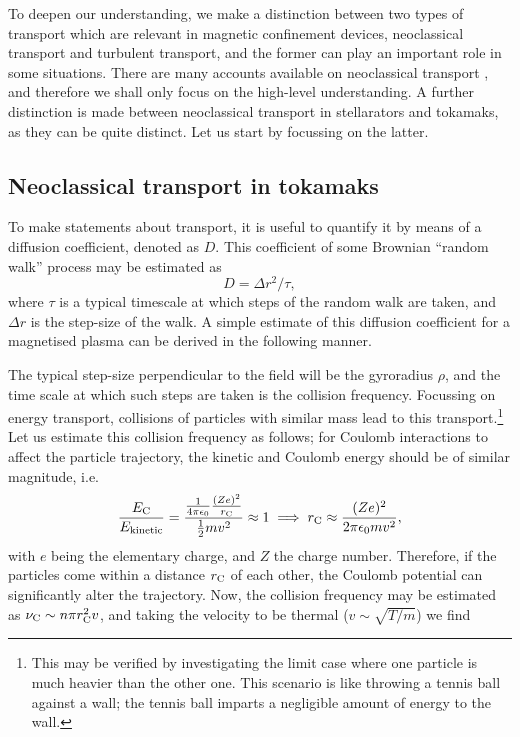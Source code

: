 To deepen our understanding, we make a distinction between two types of transport which are relevant in magnetic confinement devices, neoclassical transport and turbulent transport, and the former can play an important role in some situations. There are many accounts available on neoclassical transport \cite{galeev1979reviews,kovrizhnykh1984energy,mynick2006transport,freidberg2008plasma,beidler2011benchmarking,wesson2011tokamaks}, and therefore we shall only focus on the high-level understanding. A further distinction is made between neoclassical transport in stellarators and tokamaks, as they can be quite distinct. Let us start by focussing on the latter.

\subsection{Neoclassical transport in tokamaks}
To make statements about transport, it is useful to quantify it by means of a diffusion coefficient, denoted as $D$. This coefficient of some Brownian ``random walk'' process may be estimated as
\begin{equation*}
    D = \Delta r^2/\tau,
\end{equation*}
where $\tau$ is a typical timescale at which steps of the random walk are taken, and $\Delta r$ is the step-size of the walk. A simple estimate of this diffusion coefficient for a magnetised plasma can be derived in the following manner. \par 
The typical step-size perpendicular to the field will be the gyroradius $\rho$, and the time scale at which such steps are taken is the collision frequency. Focussing on energy transport, collisions of particles with similar mass lead to this transport.\footnote{This may be verified by investigating the limit case where one particle is much heavier than the other one. This scenario is like throwing a tennis ball against a wall; the tennis ball imparts a negligible amount of energy to the wall.} Let us estimate this collision frequency as follows; for Coulomb interactions to affect the particle trajectory, the kinetic and Coulomb energy should be of similar magnitude, i.e.
\begin{equation*}
    \frac{E_{\rm C}}{E_{\rm kinetic}} = \frac{\frac{1}{4\pi \epsilon_0} \frac{(Ze)^2}{r_{\rm C}} }{\frac{1}{2} m v^2} \approx 1 \implies r_{\rm C} \approx \frac{(Ze)^2}{2 \pi \epsilon_0 m v^2},
\end{equation*}
with $e$ being the elementary charge, and $Z$ the charge number. Therefore, if the particles come within a distance $r_{\rm C}$ of each other, the Coulomb potential can significantly alter the trajectory. Now, the collision frequency may be estimated as $\nu_{\rm C} \sim n \pi r_{\rm C}^2 v$, and taking the velocity to be thermal ($v \sim \sqrt{T/m}$) we find
